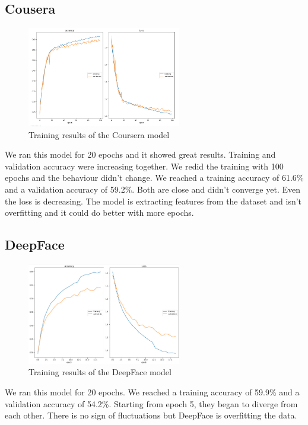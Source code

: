 \documentclass[12pt,a4paper,oneside,english]{book}
\begin{document}
\subsection{Cousera}
\begin{figure}[H]
    \centering
    \includegraphics[width=0.6\textwidth]{figures/model/courseragraph.jpg}
    \caption{Training results of the Coursera model}
    \label{fig:courseragraph}
\end{figure}
\noindent
We ran this model for 20 epochs and it showed great results. Training and validation accuracy were increasing together. We redid the training with 100 epochs and the behaviour didn't change. We reached a training accuracy of 61.6\% and a validation accuracy of 59.2\%. Both are close and didn't converge yet. Even the loss is decreasing. The model is extracting features from the dataset and isn't overfitting and it could do better with more epochs.
\subsection{DeepFace}
\begin{figure}[H]
    \centering
    \includegraphics[width=0.6\textwidth]{figures/model/deepfacegraph.jpg}
    \caption{Training results of the DeepFace model}
    \label{fig:deepfacegraph}
\end{figure}
\noindent
We ran this model for 20 epochs. We reached a training accuracy of 59.9\% and a validation accuracy of 54.2\%. Starting from epoch 5, they began to diverge from each other. There is no sign of fluctuations but DeepFace is overfitting the data.
\end{document}
